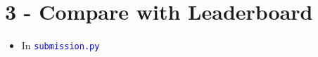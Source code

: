 \documentclass[12pt]{article}
\begin{document}
\section*{3 - Compare with Leaderboard}
\begin{itemize}
\item In \textcolor{blue}{\texttt{submission.py}}
\end{itemize}
\end{document}
